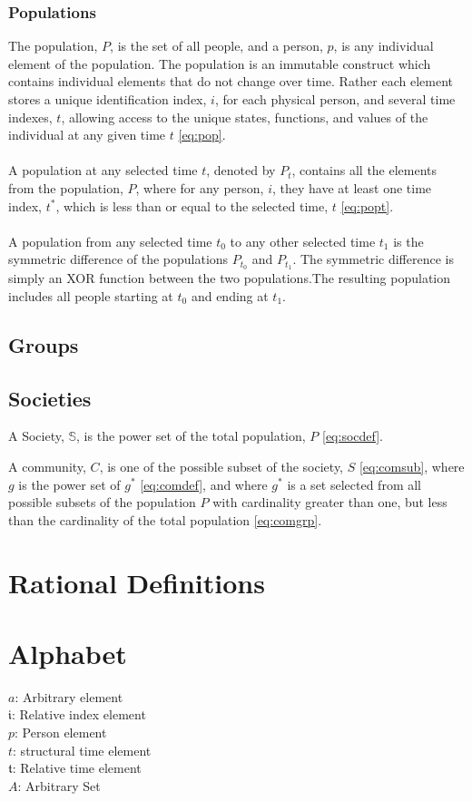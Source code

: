 \documentclass[]{article}
\begin{document}
\subsubsection*{Populations}
The population, $P$, is the set of all people, and a person, $p$, is any individual element of the population. The population is an immutable construct which contains individual elements that do not change over time. Rather each element stores a unique identification index, $i$, for each physical person, and several time indexes, $t$, allowing access to the unique states, functions, and values of the individual at any given time $t$ \eqref{eq:pop}.
\\
\\
A population at any selected time $t$, denoted by $P_{t}$, contains all the elements from the population, $P$, where for any person, $i$, they have at least one time index, $t^{*}$, which is less than or equal to the selected time, $t$ \eqref{eq:popt}.  
\\
\\
A population from any selected time $t_{0}$ to any other selected time $t_{1}$ is the symmetric difference of the populations $P_{t_{0}}$ and $P_{t_{1}}$. The symmetric difference is simply an XOR function between the two populations.The resulting population includes all people starting at $t_{0}$ and ending at $t_{1}$.
% 


%
\subsection*{Groups}

\subsection*{Societies}
%
A Society, $\mathbb{S}$, is the power set of the total population, $P$ \eqref{eq:socdef}.

%
A community, $C$, is one of the possible subset of the society, $S$ \eqref{eq:comsub}, where $g$ is the power set of $g^{*}$ \eqref{eq:comdef}, and where $g^{*}$ is a set selected from all possible subsets of the population $P$ with cardinality greater than one, but less than the cardinality of the total population \eqref{eq:comgrp}.
 
%
\section*{Rational Definitions}
\section*{Alphabet}
$a$: Arbitrary element \\
$\mathfrak{i}$: Relative index element \\
$p$: Person element \\
$t$: structural time element \\
$\mathfrak{t}$: Relative time element \\
$A$: Arbitrary Set \\
\end{document}
